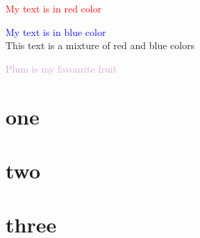 \documentclass{article}
\begin{document}
	\pagecolor{Goldenrod!50}
	
	\textcolor{red}{My text is in red color}   
    
	\textcolor{blue}{My text is in blue color}       
	\\
	
	\textcolor{red!50!blue}{This text is a mixture of red and blue colors}
	
	\textcolor{Plum}{Plum is my favourite fruit}


	\section{one}
	\begin{flushleft}
		\lipsum[2-2]
	\end{flushleft}
	
	\section{two}
	\begin{center}
		\lipsum[2-2]
	\end{center}
	
	\section{three}
	\begin{flushright}
		\lipsum[2-2]
	\end{flushright}

	\pagebreak

	\centering
	\lipsum[1-1]
	
	\flushleft
	\lipsum[2-2]
	
	\flushright
	\lipsum[3-3]
	
	\justify
	\lipsum[4-4]
	
	\begin{doublespace}
		\lipsum[1-2]
	\end{doublespace}
	
	\lipsum[1-2]
	
	\pagebreak
	
	\lipsum[2-2]
	\smallskip
	
	\lipsum[2-2]
	\medskip
	
	\lipsum[2-2]
	\bigskip
	
	\lipsum[2-2]
	\vspace{20pt}
	
	\lipsum[2-2]
	
	\pagebreak
	
	\lipsum[2-2]
	\vfill
	
\end{document}
